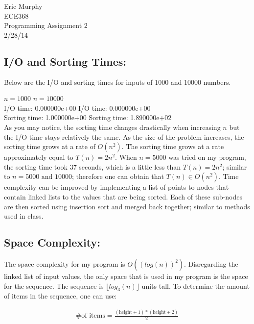 \documentclass[12pt]{article}
\begin{document}
\begin{flushright}
  Eric Murphy \\
  ECE368 \\
  Programming Assignment 2 \\
  2/28/14
\end{flushright}

\subsection*{I/O and Sorting Times:}
Below are the I/O and sorting times for inputs of 1000 and 10000 numbers.
\newline

\noindent $n = 1000$ \hfill $n = 10000$ \\
I/O time: 0.000000e+00 \hfill I/O time: 0.000000e+00 \\
Sorting time: 1.000000e+00 \hfill Sorting time: 1.890000e+02 \\

\noindent As you may notice, the sorting time changes drastically when increasing $n$ but the I/O time stays relatively the same. As the size of the problem increases, the sorting time grows at a rate of $ O(n^2)$. The sorting time grows at a rate approximately equal to $T(n) = 2n^2$. When $n = 5000$ was tried on my program, the sorting time took 37 seconds, which is a little less than $T(n) = 2n^2$; similar to $n = 5000 \mbox{ and } 10000$; therefore one can obtain that $T(n) \in O(n^2)$. Time complexity can be improved by implementing a list of points to nodes that contain linked lists to the values that are being sorted. Each of these sub-nodes are then sorted using insertion sort and merged back together; similar to methods used in class.

\subsection*{Space Complexity:}
The space complexity for my program is $O((log(n))^2)$. Disregarding the linked list of input values, the only space that is used in my program is the space for the sequence. The sequence is $\lfloor log_3(n) \rfloor$ units tall. To determine the amount of items in the sequence, one can use:

\begin{align*}
  \mbox{\# of items} = \frac{(\mbox{height} + 1) * (\mbox{height} + 2)}{2} \\
\end{align*}
\end{document}
